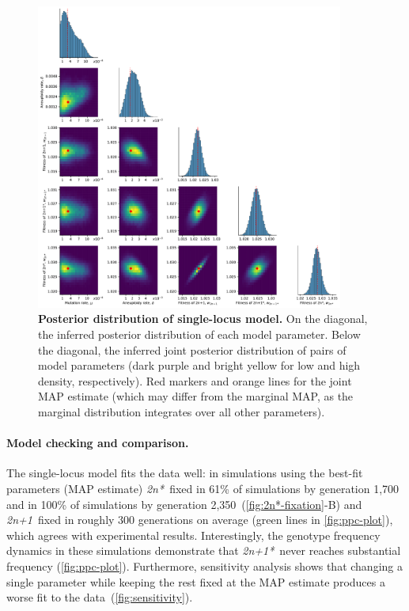 \documentclass[12pt]{extarticle}
\newcommand{\anwt}{\emph{2n+1}}
\newcommand{\eumt}{\emph{2n*}}
\newcommand{\anmt}{\emph{2n+1*}}
\begin{document}
\begin{figure}[h!]
  \centering
\includegraphics[width=0.9\textwidth]{../figures/posterior.pdf}
  \caption{
  \textbf{Posterior distribution of single-locus model.}
On the diagonal, the inferred posterior distribution of each model parameter. 
Below the diagonal, the inferred joint posterior distribution of pairs of model parameters (dark purple and bright yellow for low and high density, respectively). Red markers and orange lines for the joint MAP estimate (which may differ from the marginal MAP, as the marginal distribution integrates over all other parameters).
} 
  \label{fig:posterior}
\end{figure}


\paragraph{Model checking and comparison.}
The single-locus model fits the data well: in simulations using the best-fit parameters (MAP estimate) \eumt\ fixed in 61\% of simulations by generation 1,700 and in 100\% of simulations by generation 2,350~(\cref{fig:2n*-fixation}-B) and \anwt\ fixed in roughly 300 generations on average (green lines in \cref{fig:ppc-plot}), which agrees with experimental results.
Interestingly, the genotype frequency dynamics in these simulations demonstrate that \anmt\ never reaches substantial frequency (\cref{fig:ppc-plot}). %
Furthermore, sensitivity analysis shows that changing a single parameter while keeping the rest fixed at the MAP estimate produces a worse fit to the data~(\cref{fig:sensitivity}).
\end{document}
